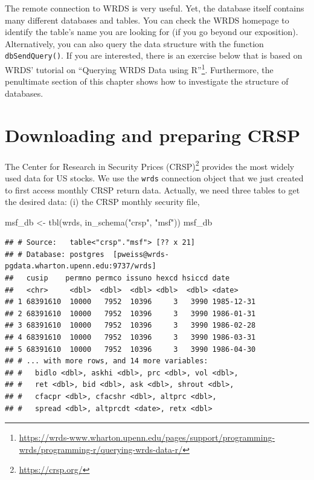 \documentclass[
]{book}
\newenvironment{Shaded}{\begin{snugshade}}{\end{snugshade}}
\newcommand{\FunctionTok}[1]{\textcolor[rgb]{0,0,0}{#1}}
\newcommand{\NormalTok}[1]{#1}
\newcommand{\OtherTok}[1]{\textcolor[rgb]{0.37,0.37,0.37}{#1}}
\newcommand{\StringTok}[1]{\textcolor[rgb]{0.5,0.5,0.5}{#1}}
\renewcommand{\href}[2]{#2\footnote{\url{#1}}}
\begin{document}
The remote connection to WRDS is very useful. Yet, the database itself contains many different databases and tables. You can check the WRDS homepage to identify the table's name you are looking for (if you go beyond our exposition). Alternatively, you can also query the data structure with the function \texttt{dbSendQuery()}. If you are interested, there is an exercise below that is based on WRDS' tutorial on \href{https://wrds-www.wharton.upenn.edu/pages/support/programming-wrds/programming-r/querying-wrds-data-r/}{``Querying WRDS Data using R''}. Furthermore, the penultimate section of this chapter shows how to investigate the structure of databases.

\hypertarget{downloading-and-preparing-crsp}{%
\section{Downloading and preparing CRSP}\label{downloading-and-preparing-crsp}}

\href{https://crsp.org/}{The Center for Research in Security Prices (CRSP)} provides the most widely used data for US stocks. We use the \texttt{wrds} connection object that we just created to first access monthly CRSP return data. Actually, we need three tables to get the desired data: (i) the CRSP monthly security file,

\begin{Shaded}
\begin{Highlighting}[]
\NormalTok{msf\_db }\OtherTok{\textless{}{-}} \FunctionTok{tbl}\NormalTok{(wrds, }\FunctionTok{in\_schema}\NormalTok{(}\StringTok{"crsp"}\NormalTok{, }\StringTok{"msf"}\NormalTok{))}
\NormalTok{msf\_db}
\end{Highlighting}
\end{Shaded}

\begin{verbatim}
## # Source:   table<"crsp"."msf"> [?? x 21]
## # Database: postgres  [pweiss@wrds-pgdata.wharton.upenn.edu:9737/wrds]
##   cusip    permno permco issuno hexcd hsiccd date      
##   <chr>     <dbl>  <dbl>  <dbl> <dbl>  <dbl> <date>    
## 1 68391610  10000   7952  10396     3   3990 1985-12-31
## 2 68391610  10000   7952  10396     3   3990 1986-01-31
## 3 68391610  10000   7952  10396     3   3990 1986-02-28
## 4 68391610  10000   7952  10396     3   3990 1986-03-31
## 5 68391610  10000   7952  10396     3   3990 1986-04-30
## # ... with more rows, and 14 more variables:
## #   bidlo <dbl>, askhi <dbl>, prc <dbl>, vol <dbl>,
## #   ret <dbl>, bid <dbl>, ask <dbl>, shrout <dbl>,
## #   cfacpr <dbl>, cfacshr <dbl>, altprc <dbl>,
## #   spread <dbl>, altprcdt <date>, retx <dbl>
\end{verbatim}
\end{document}
